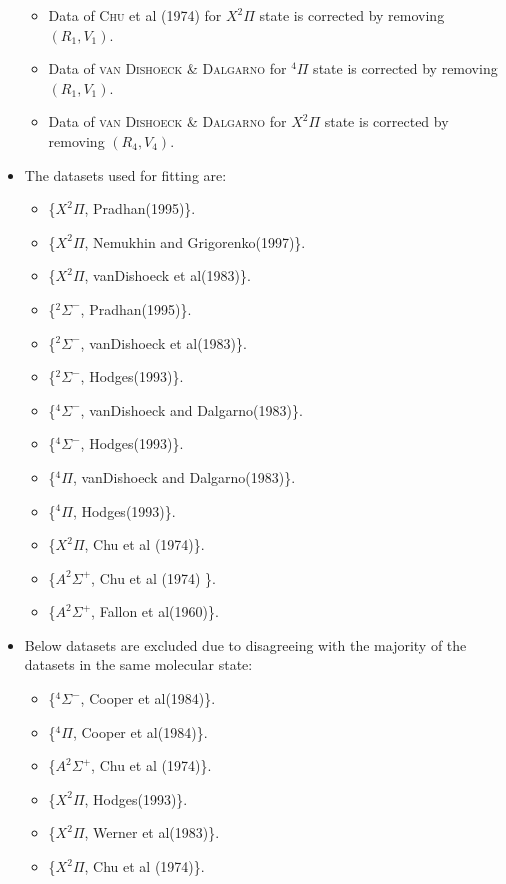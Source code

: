 \documentclass[12pt]{article}
\begin{document}
\begin{itemize}
\begin{itemize}
        \item Data of \textsc{Chu} et al (1974) \cite{idx159} for $X^2\Pi$ state is corrected by removing $(R_1, V_1)$.
        \item Data of \textsc{van Dishoeck \& Dalgarno} \cite{idx164} for $^4\Pi$ state is corrected by removing $(R_1, V_1)$.
        \item Data of \textsc{van Dishoeck \& Dalgarno} \cite{idx164} for $X^2\Pi$ state is corrected by removing $(R_4, V_4)$.
    \end{itemize}
    \item The datasets used for fitting are:
    \begin{itemize}
        \item \{$X^2\Pi$, Pradhan(1995)\}.
        \item \{$X^2\Pi$, Nemukhin and Grigorenko(1997)\}.
        \item \{$X^2\Pi$, vanDishoeck et al(1983)\}.
        \item \{$^2\Sigma^-$, Pradhan(1995)\}.
        \item \{$^2\Sigma^-$, vanDishoeck et al(1983)\}.
        \item \{$^2\Sigma^-$, Hodges(1993)\}.
        \item \{$^4\Sigma^-$, vanDishoeck and Dalgarno(1983)\}.
        \item \{$^4\Sigma^-$, Hodges(1993)\}.
        \item \{$^4\Pi$, vanDishoeck and Dalgarno(1983)\}.
        \item \{$^4\Pi$, Hodges(1993)\}.
        \item \{$X^2\Pi$, Chu et al (1974)\}.
        \item \{$A^2\Sigma^+$, Chu et al (1974) \}.
        \item \{$A^2\Sigma^+$, Fallon et al(1960)\}.
    \end{itemize}
    \item Below datasets are excluded due to disagreeing with the majority of the datasets in the same molecular state:
    \begin{itemize}
        \item \{$^4\Sigma^-$, Cooper et al(1984)\}.
        \item \{$^4\Pi$, Cooper et al(1984)\}.
        \item \{$A^2\Sigma^+$, Chu et al (1974)\}.
        \item \{$X^2\Pi$,  Hodges(1993)\}.
        \item \{$X^2\Pi$, Werner et al(1983)\}.
        \item \{$X^2\Pi$, Chu et al (1974)\}.
    \end{itemize}
\end{itemize}
\end{document}
